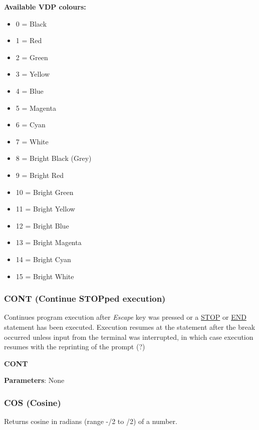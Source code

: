     \textbf{Available VDP colours:}

    \begin{itemize}
        \item 0 = Black
        \item 1 = Red
        \item 2 = Green
        \item 3 = Yellow
        \item 4 = Blue
        \item 5 = Magenta
        \item 6 = Cyan
        \item 7 = White
        \item 8 = Bright Black (Grey)
        \item 9 = Bright Red
        \item 10 = Bright Green
        \item 11 = Bright Yellow
        \item 12 = Bright Blue
        \item 13 = Bright Magenta
        \item 14 = Bright Cyan
        \item 15 = Bright White
    \end{itemize}

    \subsubsection{{CONT (Continue STOPped execution)}}
    \label{msbasic:lang:cont}
    Continues program execution after \textit{Escape} key was pressed or a 
    \hyperref[msbasic:lang:stop]{STOP} or \hyperref[msbasic:lang:end]{END}
    statement has been executed. Execution resumes at the statement after
    the break occurred unless input from the terminal was interrupted, in which
    case execution resumes with the reprinting of the prompt (?)

    \hspace{1.9cm}\textbf{CONT}

    \textbf{Parameters}: None

    \subsubsection{{COS (Cosine)}}
    \label{msbasic:lang:cos}
    Returns cosine in radians (range -\textpi/2 to \textpi/2) of a number.


